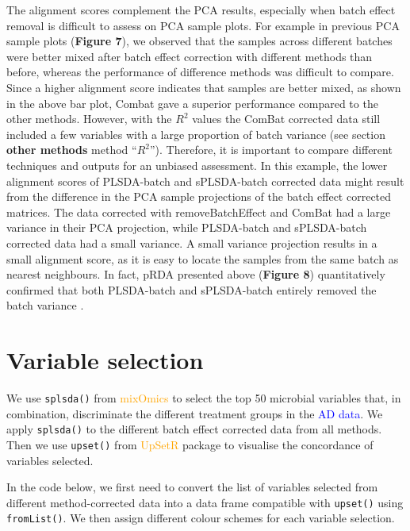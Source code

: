 \documentclass[
]{book}
\begin{document}
The alignment scores complement the PCA results, especially when batch effect removal is difficult to assess on PCA sample plots. For example in previous PCA sample plots (\textbf{Figure 7}), we observed that the samples across different batches were better mixed after batch effect correction with different methods than before, whereas the performance of difference methods was difficult to compare. Since a higher alignment score indicates that samples are better mixed, as shown in the above bar plot, Combat gave a superior performance compared to the other methods. However, with the \(R^2\) values the ComBat corrected data still included a few variables with a large proportion of batch variance (see section \textbf{other methods} method ``\(R^2\)''). Therefore, it is important to compare different techniques and outputs for an unbiased assessment. In this example, the lower alignment scores of PLSDA-batch and sPLSDA-batch corrected data might result from the difference in the PCA sample projections of the batch effect corrected matrices. The data corrected with removeBatchEffect and ComBat had a large variance in their PCA projection, while PLSDA-batch and sPLSDA-batch corrected data had a small variance. A small variance projection results in a small alignment score, as it is easy to locate the samples from the same batch as nearest neighbours. In fact, pRDA presented above (\textbf{Figure 8}) quantitatively confirmed that both PLSDA-batch and sPLSDA-batch entirely removed the batch variance \citep{wang2020multivariate}.

\hypertarget{variable-selection}{%
\section{Variable selection}\label{variable-selection}}

We use \texttt{splsda()} from \textcolor{orange}{mixOmics} to select the top 50 microbial variables that, in combination, discriminate the different treatment groups in the \textcolor{blue}{AD data}. We apply \texttt{splsda()} to the different batch effect corrected data from all methods. Then we use \texttt{upset()} from \textcolor{orange}{UpSetR} package \citep{lex2014upset} to visualise the concordance of variables selected.

In the code below, we first need to convert the list of variables selected from different method-corrected data into a data frame compatible with \texttt{upset()} using \texttt{fromList()}. We then assign different colour schemes for each variable selection.
\end{document}
